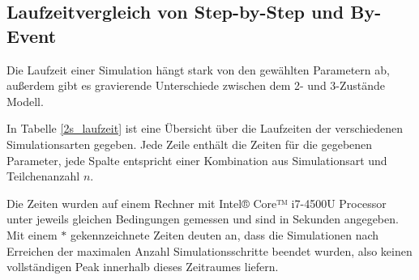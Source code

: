 \subsection{Laufzeitvergleich von Step-by-Step und By-Event}
\label{chapter:imp_laufzeit_sim}
Die Laufzeit einer Simulation hängt stark von den gewählten Parametern ab, außerdem gibt es gravierende Unterschiede zwischen dem 2- und 3-Zustände Modell.

In Tabelle \ref{2s_laufzeit} ist eine Übersicht über die Laufzeiten der verschiedenen Simulationsarten gegeben. 
Jede Zeile enthält die Zeiten für die gegebenen Parameter, jede Spalte entspricht einer Kombination aus Simulationsart und Teilchenanzahl $n$.

Die Zeiten wurden auf einem Rechner mit Intel® Core™ i7-4500U Processor 
unter jeweils gleichen Bedingungen gemessen und sind in Sekunden angegeben. 
Mit einem $*$ gekennzeichnete Zeiten deuten an, dass die Simulationen nach Erreichen der maximalen Anzahl Simulationsschritte beendet wurden, also keinen vollständigen Peak innerhalb dieses Zeitraumes liefern.


